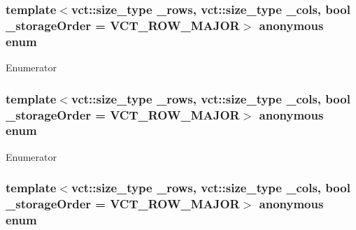 \hypertarget{group__cisst_numerical_ga8bc802fdd01983a924581cc069adbb4f}{}\subsubsection[{anonymous enum}]{\setlength{\rightskip}{0pt plus 5cm}template$<$vct\+::size\+\_\+type \+\_\+rows, vct\+::size\+\_\+type \+\_\+cols, bool \+\_\+storage\+Order = V\+C\+T\+\_\+\+R\+O\+W\+\_\+\+M\+A\+J\+O\+R$>$ anonymous enum}\label{group__cisst_numerical_ga8bc802fdd01983a924581cc069adbb4f}
\begin{Desc}
\item[Enumerator]\par
\begin{description}
\item[{\em 
\hypertarget{group__cisst_numerical_gga8bc802fdd01983a924581cc069adbb4fa017d2b71061eea6ea68ce5346c3bc89c}{}N\label{group__cisst_numerical_gga8bc802fdd01983a924581cc069adbb4fa017d2b71061eea6ea68ce5346c3bc89c}
}]\end{description}
\end{Desc}
\hypertarget{group__cisst_numerical_gafb681ba76528002648a3337870ca613b}{}\subsubsection[{anonymous enum}]{\setlength{\rightskip}{0pt plus 5cm}template$<$vct\+::size\+\_\+type \+\_\+rows, vct\+::size\+\_\+type \+\_\+cols, bool \+\_\+storage\+Order = V\+C\+T\+\_\+\+R\+O\+W\+\_\+\+M\+A\+J\+O\+R$>$ anonymous enum}\label{group__cisst_numerical_gafb681ba76528002648a3337870ca613b}
\begin{Desc}
\item[Enumerator]\par
\begin{description}
\item[{\em 
\hypertarget{group__cisst_numerical_ggafb681ba76528002648a3337870ca613baded94c86f27589c19e93b3c9931b323f}{}M\+I\+N\+\_\+\+M\+N\label{group__cisst_numerical_ggafb681ba76528002648a3337870ca613baded94c86f27589c19e93b3c9931b323f}
}]\end{description}
\end{Desc}
\hypertarget{group__cisst_numerical_ga9aa806035871c0ffffd463383dc15231}{}\subsubsection[{anonymous enum}]{\setlength{\rightskip}{0pt plus 5cm}template$<$vct\+::size\+\_\+type \+\_\+rows, vct\+::size\+\_\+type \+\_\+cols, bool \+\_\+storage\+Order = V\+C\+T\+\_\+\+R\+O\+W\+\_\+\+M\+A\+J\+O\+R$>$ anonymous enum}\label{group__cisst_numerical_ga9aa806035871c0ffffd463383dc15231}
